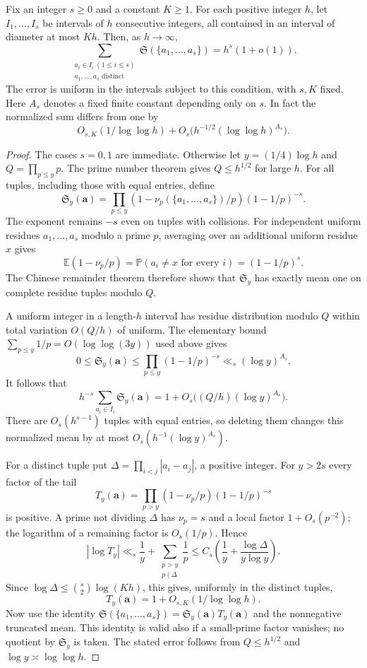 \begin{lemma}\label{lem:singular-average}
Fix an integer $s\ge0$ and a constant $K\ge1$. For each positive integer $h$,
let $I_1,\ldots,I_s$ be intervals of $h$ consecutive integers, all contained
in an interval of diameter at most $Kh$. Then, as $h\to\infty$,
\[
 \sum_{\substack{a_i\in I_i\ (1\le i\le s)\\a_1,\ldots,a_s\text{ distinct}}}
 \mathfrak S(\{a_1,\ldots,a_s\})=h^s(1+o(1)).
\]
The error is uniform in the intervals subject to this condition, with $s,K$
fixed. Here $A_s$ denotes a fixed finite constant depending only on $s$. In fact the normalized sum differs from one by
\[
 O_{s,K}(1/\log\log h)+O_s\big(h^{-1/2}(\log\log h)^{A_s}\big).
\]
\end{lemma}

\begin{proof}
The cases $s=0,1$ are immediate. Otherwise let $y=(1/4)\log h$ and
$Q=\prod_{p\le y}p$. The prime number theorem gives $Q\le h^{1/2}$ for large
$h$. For all tuples, including those with equal entries, define
\[
 \mathfrak S_y(\mathbf a)=\prod_{p\le y}
 (1-\nu_p(\{a_1,\ldots,a_s\})/p)(1-1/p)^{-s}.
\]
The exponent remains $-s$ even on tuples with collisions. For independent
uniform residues $a_1,\ldots,a_s$ modulo a prime $p$, averaging over an
additional uniform residue $x$ gives
\[
 \mathbb E(1-\nu_p/p)
 =\mathbb P(a_i\ne x\text{ for every }i)=(1-1/p)^s.
\]
The Chinese remainder theorem therefore shows that $\mathfrak S_y$ has
exactly mean one on complete residue tuples modulo $Q$.

A uniform integer in a length-$h$ interval has residue distribution modulo
$Q$ within total variation $O(Q/h)$ of uniform. The elementary bound $\sum_{p\le y}1/p=O(\log\log(3y))$ used above gives
\[
 0\le\mathfrak S_y(\mathbf a)
 \le\prod_{p\le y}(1-1/p)^{-s}\ll_s(\log y)^{A_s}.
\]
It follows that
\[
 h^{-s}\sum_{a_i\in I_i}\mathfrak S_y(\mathbf a)
 =1+O_s\big((Q/h)(\log y)^{A_s}\big).
\]
There are $O_s(h^{s-1})$ tuples with equal entries, so deleting them changes
this normalized mean by at most $O_s(h^{-1}(\log y)^{A_s})$.

For a distinct tuple put $\Delta=\prod_{i<j}|a_i-a_j|$, a positive integer.
For $y>2s$ every factor of the tail
\[
 T_y(\mathbf a)=\prod_{p>y}(1-\nu_p/p)(1-1/p)^{-s}
\]
is positive. A prime not dividing $\Delta$ has $\nu_p=s$ and a local factor
$1+O_s(p^{-2})$; the logarithm of a remaining factor is $O_s(1/p)$. Hence
\[
 |\log T_y|\ll_s \frac1y+\sum_{\substack{p>y\\p\mid\Delta}}\frac1p
 \le C_s\left(\frac1y+\frac{\log\Delta}{y\log y}\right).
\]
Since $\log\Delta\le\binom s2\log(Kh)$, this gives, uniformly in the distinct
tuples,
\[
 T_y(\mathbf a)=1+O_{s,K}(1/\log\log h).
\]
Now use the identity $\mathfrak S(\{a_1,\ldots,a_s\})=\mathfrak S_y(\mathbf a)T_y(\mathbf a)$
and the nonnegative truncated mean. This identity is valid also if a
small-prime factor vanishes; no quotient by $\mathfrak S_y$ is taken.
The stated error follows from $Q\le h^{1/2}$ and $\log y\asymp\log\log h$.
\end{proof}

